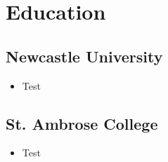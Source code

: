 \section*{Education}

\subsection*{Newcastle University}
\begin{itemize}
    \item Test
\end{itemize}

\subsection*{St. Ambrose College}
\begin{itemize}
    \item Test
\end{itemize}
